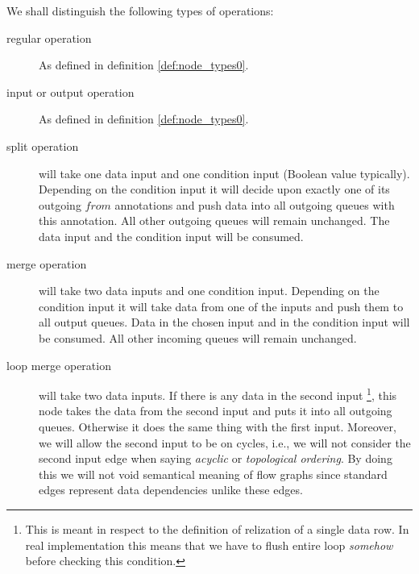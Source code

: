 \begin{define}
  We shall distinguish the following types of operations:
\begin{description}
\item [regular operation] As defined in definition \ref{def:node_types0}.
\item [input or output operation] As defined in definition \ref{def:node_types0}.
  \item [split operation] will take one data input and one condition input (Boolean value typically). Depending on the condition input it will decide upon exactly one of its outgoing $from$ annotations and push data into all outgoing queues with this annotation. All other outgoing queues will remain unchanged. The data input and the condition input will be consumed.
  \item [merge operation] will take two data inputs and one condition input. Depending on the condition input it will take data from one of the inputs and push them to all output queues. Data in the chosen input and in the condition input will be consumed. All other incoming queues will remain unchanged.

  \item [loop merge operation] will take two data inputs. If there is any data in the second input \footnote{This is meant in respect to the definition of relization of a single data row. In real implementation this means that we have to flush entire loop \emph{somehow} before checking this condition.}, this node takes the data from the second input and puts it into all outgoing queues. Otherwise it does the same thing with the first input. Moreover, we will allow the second input to be on cycles, i.e., we will not consider the second input edge when saying \emph{acyclic} or \emph{topological ordering}. By doing this we will not void semantical meaning of flow graphs since standard edges represent data dependencies unlike these edges. 



\end{description}
\end{define}
